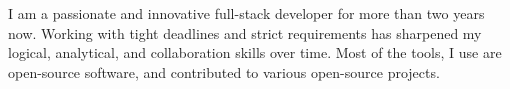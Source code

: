 \documentclass[10pt,a4paper,ragged2e,withhyper]{altacv}
\begin{document}


\makecvheader

\divider

I am a passionate and innovative full-stack developer for more than two years now. Working with tight deadlines and strict requirements has sharpened my logical, analytical, and collaboration skills over time. Most of the tools, I use are open-source software, and contributed to various open-source projects.


\end{document}
